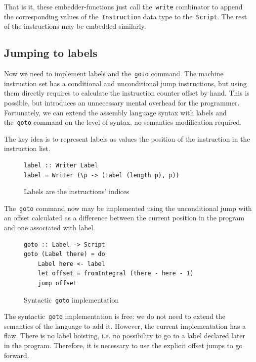 That is it, these embedder-functions just call the~\texttt{write}
combinator to append the corresponding values of the~\texttt{Instruction}
data type to the~\texttt{Script}. The rest of the instructions may
be embedded similarly.

\subsection{Jumping to labels}

Now we need to implement labels and the~\texttt{goto} command. The machine
instruction set has a conditional and unconditional jump instructions, but using them
directly requires to calculate the instruction counter offset by hand. This is possible,
but introduces an unnecessary mental overhead for the programmer. Fortunately, we
can extend the assembly language syntax with labels and the~\texttt{goto}
command on the level of syntax, no semantics modification required.

The key idea is to represent labels as values the position of the instruction in the
instruction list.

\begin{figure}[H]
\begin{verbatim}
label :: Writer Label
label = Writer (\p -> (Label (length p), p))
\end{verbatim}
\caption{Labels are the instructions' indices}
\label{label}
\end{figure}

The~\texttt{goto} command now may be implemented using the unconditional
jump with an offset calculated as a difference between the current position in the program and
one associated with label.

\begin{figure}[H]
\begin{verbatim}
goto :: Label -> Script
goto (Label there) = do
    Label here <- label
    let offset = fromIntegral (there - here - 1)
    jump offset
\end{verbatim}
\caption{Syntactic~\texttt{goto} implementation}
\label{goto}
\end{figure}

The syntactic~\texttt{goto} implementation is free: we do not need
to extend the semantics of the language to add it. However, the current implementation
has a flaw. There is no label hoisting, i.e. no possibility to go to a label declared later
in the program. Therefore, it is necessary to use the explicit offset jumps to
go forward.

